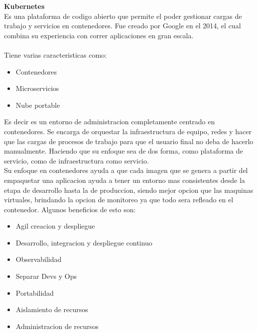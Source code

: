 \documentclass[12pt]{article}
\begin{document}
\textbf{Kubernetes} \\
Es una plataforma de codigo abierto que permite el poder gestionar cargas de trabajo y servicios en contenedores. Fue creado por Google en el 2014, el cual combina su experiencia con correr aplicaciones en gran escala.
\\\\
Tiene varias caracteristicas como:
\begin{itemize}
    \item Contenedores
    \item Microservicios
    \item Nube portable
\end{itemize}
Es decir es un entorno de administracion completamente centrado en contenedores. Se encarga de orquestar la infraestructura de equipo, redes y hacer que las cargas de procesos de trabajo para que el usuario final no deba de hacerlo manualmente. Haciendo que su enfoque sea de dos forma, como plataforma de servicio, como de infraestructura como servicio. 
\\
Su enfoque en contenedores ayuda a que cada imagen que se genera a partir del empaquetar una aplicacion ayuda a tener un entorno mas consistentes desde la etapa de desarrollo hasta la de produccion, siendo mejor opcion que las maquinas virtuales, brindando la opcion de monitoreo ya que todo sera refleado en el contenedor. Algunos beneficios de esto son:
\begin{itemize}
    \item Agil creacion y despliegue
    \item Desarrollo, integracion y despliegue continuo
    \item Observabilidad
    \item Separar Devs y Ops
    \item Portabilidad
    \item Aislamiento de recursos
    \item Administracion de recursos
\end{itemize}
\end{document}

